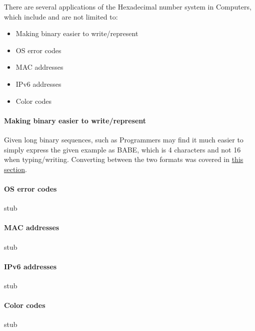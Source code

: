 \documentclass[../main.tex]{subfiles}
\begin{document}
There are several applications of the Hexadecimal number system in Computers, which include and are not limited to:

\begin{itemize}

\item Making binary easier to write/represent

\item OS error codes

\item MAC addresses

\item IPv6 addresses

\item Color codes

\end{itemize}

\paragraph{Making binary easier to write/represent}

Given long binary sequences, such as {}Programmers may find it much easier to simply express the given example as {\ccmono BABE}, which is 4 characters and not 16 when typing/writing. Converting between the two formats was covered in \hyperref[sec:1-converting-between-bin-den-and-hexadecimal]{this section}.

\paragraph{OS error codes}
stub

\paragraph{MAC addresses}
stub

\paragraph{IPv6 addresses}
stub

\paragraph{Color codes}
stub
\end{document}
